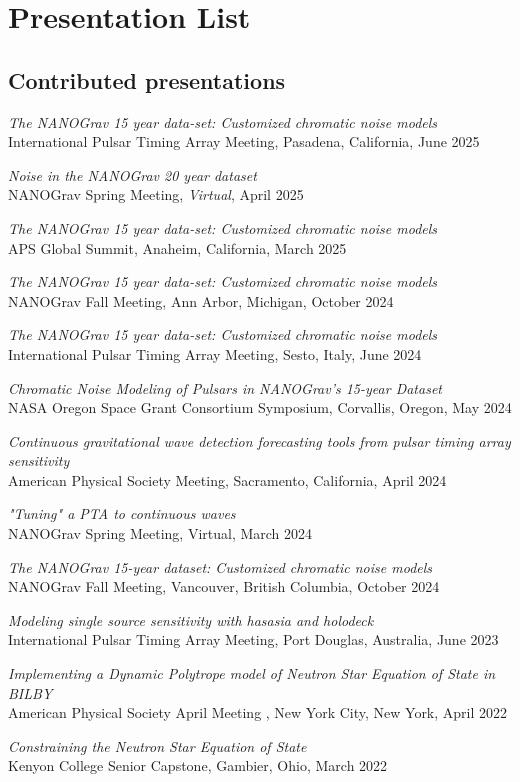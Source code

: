 \documentclass[11pt,letterpaper,sans,unicode]{moderncv}
\newcommand{\talkitem}[3]{\item \textit{#1}\\{#2}, #3} %
\newcommand{\invtalkitem}[3]{\item \textbf{#1}, \hfill{#2} \\ \textit{\color{color1}``#3''} \vspace{-0.1cm}} %
\begin{document}
{%
\section{Presentation List}



\subsection{Contributed presentations}
\renewcommand\labelenumi{\bfseries\theenumi .}
\begin{etaremune}[leftmargin=8mm]
\small
\talkitem{The NANOGrav 15 year data-set: Customized chromatic noise models}{International Pulsar Timing Array Meeting}{Pasadena, California, June 2025}
\talkitem{Noise in the NANOGrav 20 year dataset}{NANOGrav Spring Meeting}{\textit{Virtual}, April 2025}
\talkitem{The NANOGrav 15 year data-set: Customized chromatic noise models}{APS Global Summit}{Anaheim, California, March 2025}
\talkitem{The NANOGrav 15 year data-set: Customized chromatic noise models}{NANOGrav Fall Meeting}{Ann Arbor, Michigan, October 2024}
\talkitem{The NANOGrav 15 year data-set: Customized chromatic noise models}{International Pulsar Timing Array Meeting}{Sesto, Italy, June 2024}
\talkitem{Chromatic Noise Modeling of Pulsars in NANOGrav's 15-year Dataset}{NASA Oregon Space Grant Consortium Symposium}{Corvallis, Oregon, May 2024}
\talkitem{Continuous gravitational wave detection forecasting tools from pulsar timing array sensitivity}{American Physical Society Meeting}{Sacramento, California, April 2024}
\talkitem{"Tuning" a PTA to continuous waves}{NANOGrav Spring Meeting}{Virtual, March 2024}
\talkitem{The NANOGrav 15-year dataset: Customized chromatic noise models}{NANOGrav Fall Meeting}{Vancouver, British Columbia, October 2024}
\talkitem{Modeling single source sensitivity with hasasia and holodeck}{International Pulsar Timing Array Meeting}{Port Douglas, Australia, June 2023}
\talkitem{Implementing a Dynamic Polytrope model of Neutron Star Equation of State in BILBY}{American Physical Society April Meeting }{New York City, New York, April 2022}
\talkitem{Constraining the Neutron Star Equation of State}{Kenyon College Senior Capstone}{Gambier, Ohio, March 2022}




\end{etaremune}}
\end{document}

